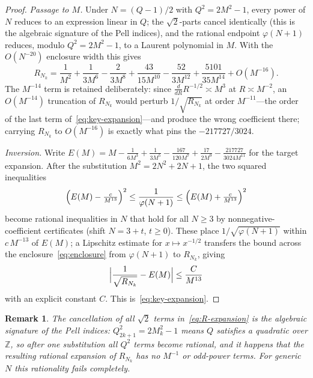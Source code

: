 \documentclass[10pt,a4paper]{amsart}
\newtheorem{remark}[theorem]{Remark}
\newcommand{\Z}{\mathbb{Z}}
\begin{document}
\begin{proof}
  \emph{Passage to $M$.}  Under $N=(Q-1)/2$ with $Q^2=2M^2-1$, every power
  of $N$ reduces to an expression linear in $Q$; the $\sqrt2$-parts cancel
  identically (this is the algebraic signature of the Pell indices), and
  the rational endpoint $\varphi(N+1)$ reduces, modulo $Q^2=2M^2-1$, to a
  Laurent polynomial in $M$.  With the $O(N^{-20})$ enclosure width this
  gives
  \begin{equation}\label{eq:R-expansion}
    R_{N_k} = \frac{1}{M^2} + \frac{1}{3M^6} - \frac{2}{3M^8}
              + \frac{43}{15M^{10}} - \frac{52}{3M^{12}}
              + \frac{5101}{35M^{14}} + O(M^{-16}).
  \end{equation}
  The $M^{-14}$ term is retained deliberately: since
  $\tfrac{d}{dR}R^{-1/2}\asymp M^{3}$ at $R\asymp M^{-2}$, an $O(M^{-14})$
  truncation of $R_{N_k}$ would perturb $1/\sqrt{R_{N_k}}$ at order
  $M^{-11}$---the order of the last term of~\eqref{eq:key-expansion}---and
  produce the wrong coefficient there; carrying $R_{N_k}$ to $O(M^{-16})$
  is exactly what pins the $-217727/3024$.

  \emph{Inversion.}  Write
  $E(M)=M-\tfrac{1}{6M^3}+\tfrac{1}{3M^5}-\tfrac{167}{120M^7}
  +\tfrac{17}{2M^9}-\tfrac{217727}{3024M^{11}}$ for the target expansion.
  After the substitution $M^2=2N^2+2N+1$, the two squared inequalities
  \[
    \Bigl(E(M)-\tfrac{c}{M^{13}}\Bigr)^{2}\le \frac{1}{\varphi(N+1)}
    \le \Bigl(E(M)+\tfrac{c}{M^{13}}\Bigr)^{2}
  \]
  become rational inequalities in $N$ that hold for all $N\ge 3$ by
  nonnegative-coefficient certificates (shift $N=3+t$, $t\ge 0$).  These
  place $1/\sqrt{\varphi(N+1)}$ within $c\,M^{-13}$ of $E(M)$; a Lipschitz
  estimate for $x\mapsto x^{-1/2}$ transfers the bound across the
  enclosure~\eqref{eq:enclosure} from $\varphi(N+1)$ to $R_{N_k}$, giving
  \[
    \Bigl|\frac{1}{\sqrt{R_{N_k}}}-E(M)\Bigr|\le\frac{C}{M^{13}}
  \]
  with an explicit constant $C$.  This is~\eqref{eq:key-expansion}.
\end{proof}

\begin{remark}
  The cancellation of all $\sqrt{2}$ terms in~\eqref{eq:R-expansion}
  is the algebraic signature of the Pell indices: $Q_{2k+1}^2 = 2M_k^2-1$
  means $Q$ satisfies a quadratic over $\Z$, so after one substitution
  all $Q^2$ terms become rational, and it happens that the resulting
  rational expansion of $R_{N_k}$ has no $M^{-1}$ or odd-power terms.
  For generic $N$ this rationality fails completely.
\end{remark}
\end{document}
